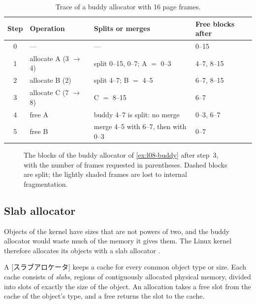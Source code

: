 \documentclass[../main.tex]{subfiles}
\begin{document}
\begin{table}[htbp]
  \centering
  \caption{Trace of a buddy allocator with 16 page frames.}
  \label{tab:l08-buddy}
  \small
  \begin{tabular}{@{}clll@{}}
    \toprule
    Step & Operation & Splits or merges & Free blocks after \\
    \midrule
    0 & ---                 & ---                                          & 0--15 \\
    1 & allocate A (3 $\to$ 4) & split 0--15, 0--7; A $=$ 0--3            & 4--7, 8--15 \\
    2 & allocate B (2)      & split 4--7; B $=$ 4--5                       & 6--7, 8--15 \\
    3 & allocate C (7 $\to$ 8) & C $=$ 8--15                              & 6--7 \\
    4 & free A              & buddy 4--7 is split: no merge                & 0--3, 6--7 \\
    5 & free B              & merge 4--5 with 6--7, then with 0--3         & 0--7 \\
    \bottomrule
  \end{tabular}
\end{table}

\begin{figure}[htbp]
  \centering
  
  \caption{The blocks of the buddy allocator of \cref{ex:l08-buddy} after
    step~3, with the number of frames requested in parentheses.  Dashed
    blocks are split; the lightly shaded frames are lost to internal
    fragmentation.}
  \label{fig:l08-buddy}
\end{figure}

\subsection{Slab allocator}

Objects of the kernel have sizes that are not powers of two, and the buddy
allocator would waste much of the memory it gives them.  The Linux kernel
therefore allocates its objects with a slab allocator
\cite{bonwick1994}.

\begin{definition}
  A [スラブアロケータ] keeps a cache for every common
  object type or size.  Each cache consists of \emph{slabs}, regions of
  contiguously allocated physical memory, divided into slots of exactly the
  size of the object.  An allocation takes a free slot from the cache of
  the object's type, and a free returns the slot to the cache.
\end{definition}
\end{document}
